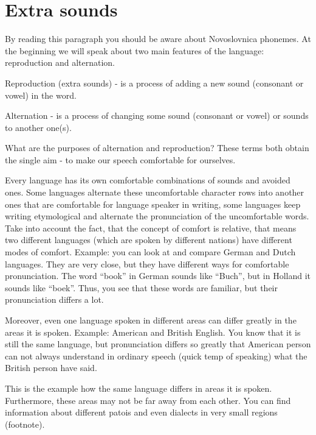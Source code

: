 \section{Extra sounds}

By reading this paragraph you should be aware about Novoslovnica phonemes. At the beginning we will speak about two main features of the language: reproduction and alternation.

Reproduction (extra sounds) - is a process of adding a new sound (consonant or vowel) in the word.

Alternation - is a process of changing some sound (consonant or vowel) or sounds to another one(s).

What are the purposes of alternation and reproduction? These terms both obtain the single aim - to make our speech comfortable for ourselves.

Every language has its own comfortable combinations of sounds and avoided ones. Some languages alternate these uncomfortable character rows into another ones that are comfortable for language speaker in writing, some languages keep writing etymological and alternate the pronunciation of the uncomfortable words. Take into account the fact, that the concept of comfort is relative, that means two different languages (which are spoken by different nations) have different modes of comfort.
Example: you can look at and compare German and Dutch languages. They are very close, but they have different ways for comfortable pronunciation. The word “book” in German sounds like “Buch”, but in Holland it sounds like “boek”. Thus, you see that these words are familiar, but their pronunciation differs a lot.

Moreover, even one language spoken in different areas can differ greatly in the areas it is spoken.
Example: American and British English. You know that it is still the same language, but pronunciation differs so greatly that American person can not always understand in ordinary speech (quick temp of speaking) what the British person have said.

This is the example how the same language differs in areas it is spoken. Furthermore, these areas may not be far away from each other. You can find information about different patois and even dialects in very small regions (footnote). 


